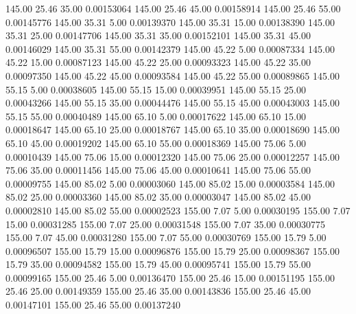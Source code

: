     145.00     25.46     35.00     0.00153064
    145.00     25.46     45.00     0.00158914
    145.00     25.46     55.00     0.00145776
    145.00     35.31      5.00     0.00139370
    145.00     35.31     15.00     0.00138390
    145.00     35.31     25.00     0.00147706
    145.00     35.31     35.00     0.00152101
    145.00     35.31     45.00     0.00146029
    145.00     35.31     55.00     0.00142379
    145.00     45.22      5.00     0.00087334
    145.00     45.22     15.00     0.00087123
    145.00     45.22     25.00     0.00093323
    145.00     45.22     35.00     0.00097350
    145.00     45.22     45.00     0.00093584
    145.00     45.22     55.00     0.00089865
    145.00     55.15      5.00     0.00038605
    145.00     55.15     15.00     0.00039951
    145.00     55.15     25.00     0.00043266
    145.00     55.15     35.00     0.00044476
    145.00     55.15     45.00     0.00043003
    145.00     55.15     55.00     0.00040489
    145.00     65.10      5.00     0.00017622
    145.00     65.10     15.00     0.00018647
    145.00     65.10     25.00     0.00018767
    145.00     65.10     35.00     0.00018690
    145.00     65.10     45.00     0.00019202
    145.00     65.10     55.00     0.00018369
    145.00     75.06      5.00     0.00010439
    145.00     75.06     15.00     0.00012320
    145.00     75.06     25.00     0.00012257
    145.00     75.06     35.00     0.00011456
    145.00     75.06     45.00     0.00010641
    145.00     75.06     55.00     0.00009755
    145.00     85.02      5.00     0.00003060
    145.00     85.02     15.00     0.00003584
    145.00     85.02     25.00     0.00003360
    145.00     85.02     35.00     0.00003047
    145.00     85.02     45.00     0.00002810
    145.00     85.02     55.00     0.00002523
    155.00      7.07      5.00     0.00030195
    155.00      7.07     15.00     0.00031285
    155.00      7.07     25.00     0.00031548
    155.00      7.07     35.00     0.00030775
    155.00      7.07     45.00     0.00031280
    155.00      7.07     55.00     0.00030769
    155.00     15.79      5.00     0.00096507
    155.00     15.79     15.00     0.00096876
    155.00     15.79     25.00     0.00098367
    155.00     15.79     35.00     0.00094582
    155.00     15.79     45.00     0.00095741
    155.00     15.79     55.00     0.00099165
    155.00     25.46      5.00     0.00136470
    155.00     25.46     15.00     0.00151195
    155.00     25.46     25.00     0.00149359
    155.00     25.46     35.00     0.00143836
    155.00     25.46     45.00     0.00147101
    155.00     25.46     55.00     0.00137240
